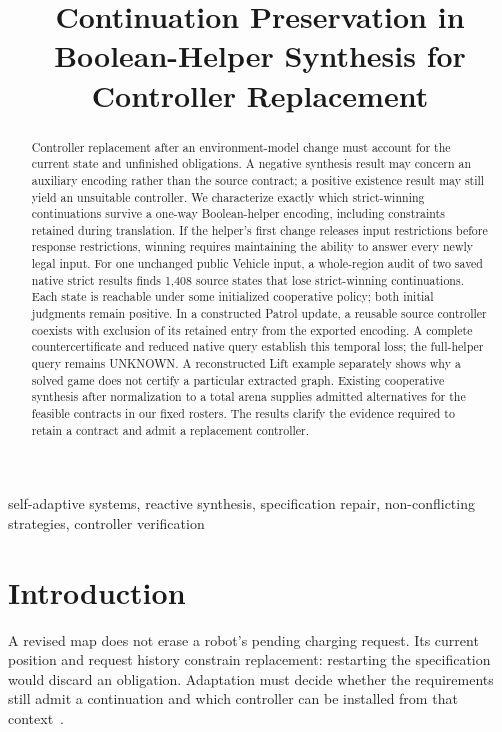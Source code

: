 \documentclass[conference,10pt]{IEEEtran}
\title{Continuation Preservation in Boolean-Helper Synthesis for Controller Replacement}
\author{\IEEEauthorblockN{Anonymous authors}}
\begin{document}
\raggedbottom\maketitle
\begin{abstract}
Controller replacement after an environment-model change must account
for the current state and unfinished obligations. A negative synthesis
result may concern an auxiliary encoding rather than the source contract;
a positive existence result may still yield an unsuitable controller.
We characterize exactly which strict-winning continuations survive a
one-way Boolean-helper encoding, including constraints retained during
translation. If the helper's first change releases input restrictions
before response restrictions, winning requires maintaining the ability
to answer every newly legal input. For one unchanged public Vehicle input,
a whole-region audit of two saved native strict results finds 1,408 source
states that lose strict-winning continuations. Each state is reachable
under some initialized cooperative policy; both initial judgments remain
positive. In a constructed Patrol update, a reusable source controller
coexists with exclusion of its retained entry from the exported encoding.
A complete countercertificate and reduced native query establish this
temporal loss; the full-helper query remains UNKNOWN. A reconstructed Lift example separately
shows why a solved game does not certify a particular extracted graph.
Existing cooperative synthesis after normalization to a total arena supplies
admitted alternatives for the feasible contracts in our fixed rosters. The results clarify the evidence required to retain a contract and admit
a replacement controller.
\end{abstract}
\begin{IEEEkeywords}
self-adaptive systems, reactive synthesis, specification repair,
non-conflicting strategies, controller verification
\end{IEEEkeywords}

\section{Introduction}\label{sec:intro}
A revised map does not erase a robot's pending charging request.
Its current position and request history constrain replacement:
restarting the specification would discard an obligation. Adaptation
must decide whether the requirements still admit a continuation and
which controller can be installed from that context~\cite{specrepair,degradation,dupdate}.
\end{document}

